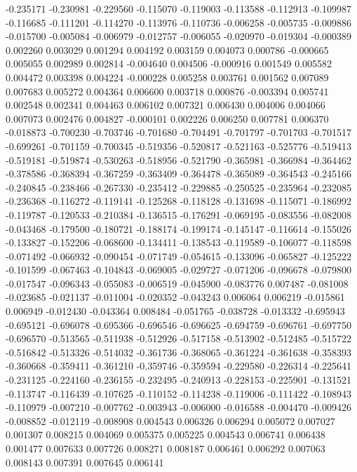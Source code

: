 -0.235171
-0.230981
-0.229560
-0.115070
-0.119003
-0.113588
-0.112913
-0.109987
-0.116685
-0.111201
-0.114270
-0.113976
-0.110736
-0.006258
-0.005735
-0.009886
-0.015700
-0.005084
-0.006979
-0.012757
-0.006055
-0.020970
-0.019304
-0.000389
0.002260
0.003029
0.001294
0.004192
0.003159
0.004073
0.000786
-0.000665
0.005055
0.002989
0.002814
-0.004640
0.004506
-0.000916
0.001549
0.005582
0.004472
0.003398
0.004224
-0.000228
0.005258
0.003761
0.001562
0.007089
0.007683
0.005272
0.004364
0.006600
0.003718
0.000876
-0.003394
0.005741
0.002548
0.002341
0.004463
0.006102
0.007321
0.006430
0.004006
0.004066
0.007073
0.002476
0.004827
-0.000101
0.002226
0.006250
0.007781
0.006370
-0.018873
-0.700230
-0.703746
-0.701680
-0.704491
-0.701797
-0.701703
-0.701517
-0.699261
-0.701159
-0.700345
-0.519356
-0.520817
-0.521163
-0.525776
-0.519413
-0.519181
-0.519874
-0.530263
-0.518956
-0.521790
-0.365981
-0.366984
-0.364462
-0.378586
-0.368394
-0.367259
-0.363409
-0.364478
-0.365089
-0.364543
-0.245166
-0.240845
-0.238466
-0.267330
-0.235412
-0.229885
-0.250525
-0.235964
-0.232085
-0.236368
-0.116272
-0.119141
-0.125268
-0.118128
-0.131698
-0.115071
-0.186992
-0.119787
-0.120533
-0.210384
-0.136515
-0.176291
-0.069195
-0.083556
-0.082008
-0.043468
-0.179500
-0.180721
-0.188174
-0.199174
-0.145147
-0.116614
-0.155026
-0.133827
-0.152206
-0.068600
-0.134411
-0.138543
-0.119589
-0.106077
-0.118598
-0.071492
-0.066932
-0.090454
-0.071749
-0.054615
-0.133096
-0.065827
-0.125222
-0.101599
-0.067463
-0.104843
-0.069005
-0.029727
-0.071206
-0.096678
-0.079800
-0.017547
-0.096343
-0.055083
-0.006519
-0.045900
-0.083776
0.007487
-0.081008
-0.023685
-0.021137
-0.011004
-0.020352
-0.043243
0.006064
0.006219
-0.015861
0.006949
-0.012430
-0.043364
0.008484
-0.051765
-0.038728
-0.013332
-0.695943
-0.695121
-0.696078
-0.695366
-0.696546
-0.696625
-0.694759
-0.696761
-0.697750
-0.696570
-0.513565
-0.511938
-0.512926
-0.517158
-0.513902
-0.512485
-0.515722
-0.516842
-0.513326
-0.514032
-0.361736
-0.368065
-0.361224
-0.361638
-0.358393
-0.360668
-0.359411
-0.361210
-0.359746
-0.359594
-0.229580
-0.226314
-0.225641
-0.231125
-0.224160
-0.236155
-0.232495
-0.240913
-0.228153
-0.225901
-0.131521
-0.113747
-0.116439
-0.107625
-0.110152
-0.114238
-0.119006
-0.111422
-0.108943
-0.110979
-0.007210
-0.007762
-0.003943
-0.006000
-0.016588
-0.004470
-0.009426
-0.008852
-0.012119
-0.008908
0.004543
0.006326
0.006294
0.005072
0.007027
0.001307
0.008215
0.004069
0.005375
0.005225
0.004543
0.006741
0.006438
0.001477
0.007633
0.007726
0.008271
0.008187
0.006461
0.006292
0.007063
0.008143
0.007391
0.007645
0.006141

